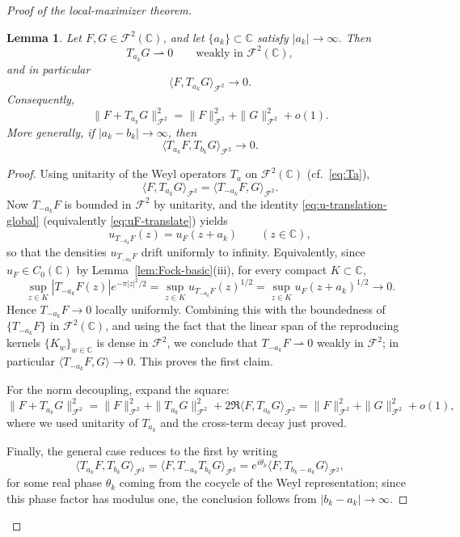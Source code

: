 \documentclass[a4paper,11pt,reqno]{amsart}
\numberwithin{equation}{section}
\theoremstyle{plain} %
\newtheorem{lemma}{Lemma}[section]
\theoremstyle{definition} %
\theoremstyle{remark}
\newcommand{\C}{\mathbb{C}}
\begin{document}
\begin{proof}[Proof of the local-maximizer theorem]
\begin{lemma}\label{lem:weyl-orthogonality-global}
Let \(F,G\in \mathcal F^2(\C)\), and let \(\{a_k\}\subset \C\) satisfy
\(|a_k|\to \infty\). Then
\[
T_{a_k}G \rightharpoonup 0
\qquad\text{weakly in }\mathcal F^2(\C),
\]
and in particular
\[
\langle F,T_{a_k}G\rangle_{\mathcal F^2}\to 0.
\]
Consequently,
\[
\|F+T_{a_k}G\|_{\mathcal F^2}^2
=
\|F\|_{\mathcal F^2}^2+\|G\|_{\mathcal F^2}^2+o(1).
\]
More generally, if \(|a_k-b_k|\to\infty\), then
\[
\langle T_{a_k}F,T_{b_k}G\rangle_{\mathcal F^2}\to 0.
\]
\end{lemma}

\begin{proof}
Using unitarity of the Weyl operators \(T_a\) on \(\mathcal F^2(\C)\) (cf.\
\eqref{eq:Ta}),
\[
\langle F,T_{a_k}G\rangle_{\mathcal F^2}
=
\langle T_{-a_k}F,G\rangle_{\mathcal F^2}.
\]
Now \(T_{-a_k}F\) is bounded in \(\mathcal F^2\) by unitarity, and the
identity \eqref{eq:u-translation-global} (equivalently
\eqref{eq:uF-translate}) yields
\[
u_{T_{-a_k}F}(z)=u_F(z+a_k)\qquad (z\in\C),
\]
so that the densities \(u_{T_{-a_k}F}\) drift uniformly to infinity.
Equivalently, since \(u_F\in C_0(\C)\) by Lemma~\ref{lem:Fock-basic}(iii), for
every compact \(K\subset \C\),
\[
\sup_{z\in K}|T_{-a_k}F(z)|e^{-\pi |z|^2/2}
=
\sup_{z\in K}u_{T_{-a_k}F}(z)^{1/2}
=
\sup_{z\in K}u_F(z+a_k)^{1/2}\to 0.
\]
Hence \(T_{-a_k}F\to 0\) locally uniformly. Combining this with the
boundedness of \(\{T_{-a_k}F\}\) in \(\mathcal F^2(\C)\), and using the fact
that the linear span of the reproducing kernels \(\{K_w\}_{w\in\C}\) is dense
in \(\mathcal F^2\), we conclude that \(T_{-a_k}F\rightharpoonup 0\) weakly in
\(\mathcal F^2\); in particular \(\langle T_{-a_k}F,G\rangle\to 0\). This
proves the first claim.

For the norm decoupling, expand the square:
\[
\|F+T_{a_k}G\|_{\mathcal F^2}^2
=
\|F\|_{\mathcal F^2}^2+\|T_{a_k}G\|_{\mathcal F^2}^2
+2\Re\langle F,T_{a_k}G\rangle_{\mathcal F^2}
=
\|F\|_{\mathcal F^2}^2+\|G\|_{\mathcal F^2}^2+o(1),
\]
where we used unitarity of \(T_{a_k}\) and the cross-term decay just proved.

Finally, the general case reduces to the first by writing
\[
\langle T_{a_k}F,T_{b_k}G\rangle_{\mathcal F^2}
=
\langle F,T_{-a_k}T_{b_k}G\rangle_{\mathcal F^2}
=
e^{i\theta_k}\langle F,T_{b_k-a_k}G\rangle_{\mathcal F^2},
\]
for some real phase \(\theta_k\) coming from the cocycle of the Weyl
representation; since this phase factor has modulus one, the conclusion
follows from \(|b_k-a_k|\to\infty\).
\end{proof}


\end{proof}
\end{document}
